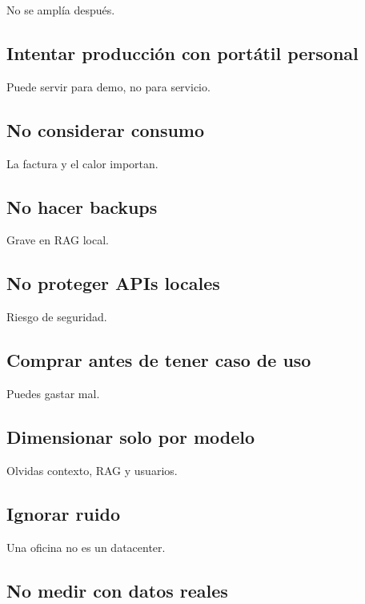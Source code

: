 No se amplía después.

\subsection{Intentar producción con portátil
personal}\label{intentar-producciuxf3n-con-portuxe1til-personal}

Puede servir para demo, no para servicio.

\subsection{No considerar consumo}\label{no-considerar-consumo}

La factura y el calor importan.

\subsection{No hacer backups}\label{no-hacer-backups}

Grave en RAG local.

\subsection{No proteger APIs locales}\label{no-proteger-apis-locales}

Riesgo de seguridad.

\subsection{Comprar antes de tener caso de
uso}\label{comprar-antes-de-tener-caso-de-uso}

Puedes gastar mal.

\subsection{Dimensionar solo por
modelo}\label{dimensionar-solo-por-modelo}

Olvidas contexto, RAG y usuarios.

\subsection{Ignorar ruido}\label{ignorar-ruido}

Una oficina no es un datacenter.

\subsection{No medir con datos reales}\label{no-medir-con-datos-reales}

